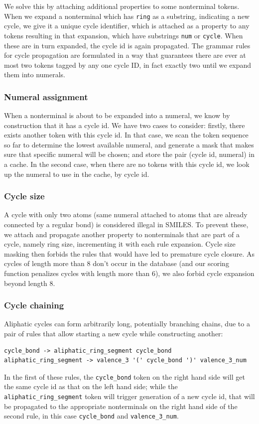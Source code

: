 \documentclass[11pt]{article}
\begin{document}
We solve this by attaching additional properties to some nonterminal tokens. When we expand a nonterminal which has \verb|ring| as a substring, indicating a new cycle, we give it a unique cycle identifier, which is attached as a property to any tokens resulting in that expansion, which have substrings \verb|num| or \verb|cycle|. When these are in turn expanded, the cycle id is again propagated. The grammar rules for cycle propagation are formulated in a way that guarantees there are ever at most two tokens tagged by any one cycle ID, in fact exactly two until we expand them into numerals.
\subsubsection{Numeral assignment}
When a nonterminal is about to be expanded into a numeral, we know by construction that it has a cycle id. We have two cases to consider: firstly, there exists another token with this cycle id. In that case, we scan the token sequence so far to determine the lowest available numeral, and generate a mask that makes sure that specific numeral will be chosen; and store the pair (cycle id, numeral) in a cache. In the second case, when there are no tokens with this cycle id, we look up the numeral to use in the cache, by cycle id.
\subsubsection{Cycle size}
A cycle with only two atoms (same numeral attached to atoms that are already connected by a regular bond) is considered illegal in SMILES. To prevent these, we attach and propagate another property to nonterminals that are part of a cycle, namely ring size, incrementing it with each rule expansion. Cycle size masking then forbids the rules that would have led to premature cycle closure. As cycles of length more than 8 don't occur in the database (and our scoring function penalizes cycles with length more than 6), we also forbid cycle expansion beyond length 8.
\subsubsection{Cycle chaining}
Aliphatic cycles can form arbitrarily long, potentially branching chains, due to a pair of rules that allow starting a new cycle while constructing another:
\begin{verbatim}
cycle_bond -> aliphatic_ring_segment cycle_bond
aliphatic_ring_segment -> valence_3 '(' cycle_bond ')' valence_3_num
\end{verbatim}
In the first of these rules, the \verb|cycle_bond| token on the right hand side will get the same cycle id as that on the left hand side; while the \verb|aliphatic_ring_segment| token will trigger generation of a new cycle id, that will be propagated to the appropriate nonterminals on the right hand side of the second rule, in this case \verb|cycle_bond| and \verb|valence_3_num|.
\end{document}
